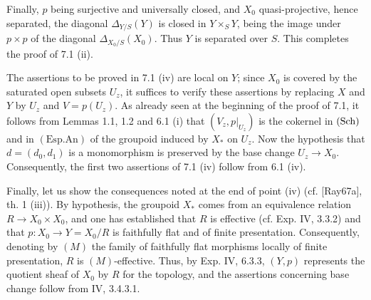 Finally, $p$ being surjective and universally closed, and $X_0$ quasi-projective, hence separated, the diagonal $\Delta_{Y/S}(Y)$ is closed in $Y\times_SY$, being the image under $p\times p$ of the diagonal $\Delta_{X_0/S}(X_0)$. Thus $Y$ is separated over $S$. This completes the proof of 7.1 (ii).

The assertions to be proved in 7.1 (iv) are local on $Y$; since $X_0$ is covered by the saturated open subsets $U_z$, it suffices to verify these assertions by replacing $X$ and $Y$ by $U_z$ and $V=p(U_z)$. As already seen at the beginning of the proof of 7.1, it follows from Lemmas 1.1, 1.2 and 6.1 (i) that $(V_z,p|_{U_z})$ is the cokernel in $\textup{(Sch)}$ and in $(\mathrm{Esp.An})$ of the groupoid induced by $X_*$ on $U_z$. Now the hypothesis that $d=(d_0,d_1)$ is a monomorphism is preserved by the base change $U_z\to X_0$. Consequently, the first two assertions of 7.1 (iv) follow from 6.1 (iv).

Finally, let us show the consequences noted at the end of point (iv) (cf. [Ray67a], th. 1 (iii)). By hypothesis, the groupoid $X_*$ comes from an equivalence relation $R\to X_0\times X_0$, and one has established that $R$ is effective (cf. Exp. IV, 3.3.2) and that $p:X_0\to Y=X_0/R$ is faithfully flat and of finite presentation. Consequently, denoting by $(M)$ the family of faithfully flat morphisms locally of finite presentation, $R$ is $(M)$-effective. Thus, by Exp. IV, 6.3.3, $(Y,p)$ represents the quotient sheaf of $X_0$ by $R$ for the \fppf topology, and the assertions concerning base change follow from IV, 3.4.3.1.

